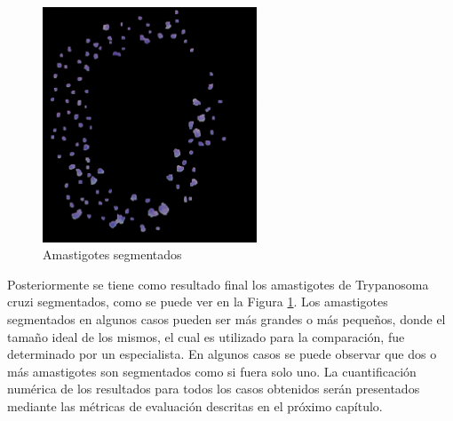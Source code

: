 \begin{figure}[h!]
\centering
\includegraphics[height=70mm]{./propuesta/amastigotes.jpg}
\caption{Amastigotes segmentados}
\label{img:imgamastigotes}
\end{figure}

Posteriormente se tiene como resultado final los amastigotes de Trypanosoma cruzi segmentados, como se puede ver en la Figura \ref{img:imgamastigotes}. Los amastigotes segmentados en algunos casos pueden ser más grandes o más pequeños, donde el tamaño ideal de los mismos, el cual es utilizado para la comparación, fue determinado por un especialista. En algunos casos se puede observar que dos o más amastigotes son segmentados como si fuera solo uno. La cuantificación numérica de los resultados para todos los casos obtenidos serán presentados mediante las métricas de evaluación descritas en el próximo capítulo.